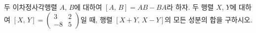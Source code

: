 \hspace*{2mm}\begin{minipage}[t]{\dimexpr\linewidth-2mm\relax}\vspace{0pt}
두 이차정사각행렬 $A$, $B$에 대하여 $[A,\,B]=AB-BA$라 하자. 두 행렬 $X$, $Y$에 대하여 $[X,\,Y]=\begin{pmatrix} 3 & 2 \\ -8 & 5 \end{pmatrix}$일 때, 행렬 $[X+Y,\,X-Y]$의 모든 성분의 합을 구하시오.\end{minipage}

